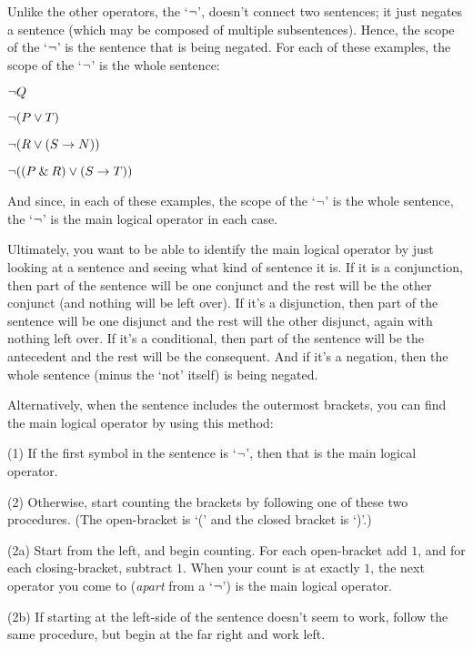 Unlike the other operators, the `${\neg}$', doesn't connect two sentences; it just negates a sentence (which may be composed of multiple subsentences). Hence, the scope of the `${\neg}$' is the sentence that is being negated. For each of these examples, the scope of the `${\neg}$' is the whole sentence: 

\begin{earg}
\item[\ex{neg1}] ${\neg} Q$
\item[\ex{neg2}] ${\neg}(P \vee T)$
\item[\ex{neg3}] ${\neg}(R \vee (S \rightarrow N))$
\item[\ex{neg4}] ${\neg}((P \mathbin{\&} R) \vee (S \rightarrow T))$
\end{earg}
And since, in each of these examples, the scope of the `${\neg}$' is the whole sentence, the `${\neg}$' is the main logical operator in each case.


Ultimately, you want to be able to identify the main logical operator by just looking at a sentence and seeing what kind of sentence it is. If it is a conjunction, then part of the sentence will be one conjunct and the rest will be the other conjunct (and nothing will be left over). If it's a disjunction, then part of the sentence will be one disjunct and the rest will the other disjunct, again with nothing left over. If it's a conditional, then part of the sentence will be the antecedent and the rest will be the consequent. And if it's a negation, then the whole sentence (minus the `not' itself) is being negated.

Alternatively, when the sentence includes the outermost brackets, you can find the main logical operator by using this method:
\begin{ebullet}
	\item[(1)] If the first symbol in the sentence is `${\neg}$', then that is the main logical operator.
	\item[(2)] Otherwise, start counting the brackets by following one of these two procedures. (The open-bracket is `(' and the closed bracket is `)'.) 
	\begin{earg}
	\item[(2a)] Start from the left, and begin counting. For each open-bracket add $1$, and for each closing-bracket, subtract $1$. When your count is at exactly $1$, the next operator you come to (\emph{apart} from a `${\neg}$') is the main logical operator. 
	\item[(2b)] If starting at the left-side of the sentence doesn't seem to work, follow the same procedure, but begin at the far right and work left. %
	\end{earg}
\end{ebullet}

